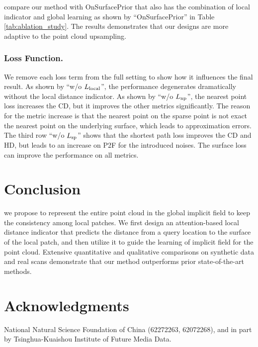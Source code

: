 \documentclass[letterpaper]{article} %
\begin{document}
 compare our method with OnSurfacePrior \cite{ma2022reconstructing} that also has the combination of local indicator and global learning as shown by ``OnSurfacePrior'' in Table \ref{tab:ablation_study}. The results demonstrates that our designs are more adaptive to the point cloud upsampling.

\subsubsection{Loss Function.}  We remove each loss term from the full setting to show how it influences the final result. As shown by ``w/o $L_{\rm{local}}$'', the performance degenerates dramatically without the local distance indicator. As shown by ``w/o $L_{\rm{np}}$'', the nearest point loss increases the CD, but it improves the other metrics significantly. The reason for the metric increase is that the nearest point on the sparse point is not exact the nearest point on the underlying surface, which leads to approximation errors. The third row ``w/o $L_{\rm{sp}}$'' shows that the shortest path loss improves the CD and HD, but leads to an increase on P2F for the introduced noises. The surface loss can improve the performance on all metrics.


\section{Conclusion}
 we propose to represent the entire point cloud in the global implicit field to keep the consistency among local patches. We first design an attention-based local distance indicator that predicts the distance from a query location to the surface of the local patch, and then utilize it to guide the learning of implicit field for the point cloud.  Extensive quantitative and qualitative comparisons on synthetic data and real scans demonstrate that our method outperforms prior state-of-the-art methods.

\section{Acknowledgments}
 National Natural Science Foundation of China (62272263, 62072268), and in part by Tsinghua-Kuaishou Institute of Future Media Data.

\clearpage

\end{document}
